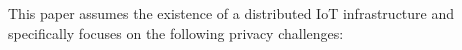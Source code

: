 This paper assumes the existence of a distributed IoT infrastructure
and specifically focuses on the following privacy challenges:
%
%
%
